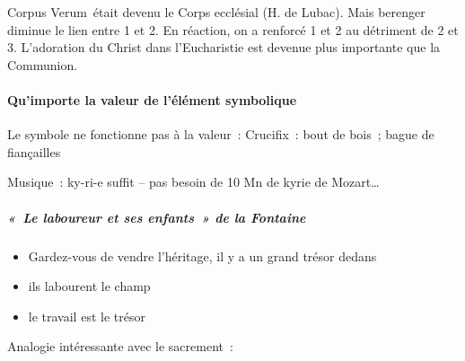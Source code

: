 Corpus Verum~était devenu le Corps ecclésial (H. de Lubac). Mais
berenger diminue le lien entre 1 et 2. En réaction, on a renforcé 1 et 2
au détriment de 2 et 3. L'adoration du Christ dans l'Eucharistie est
devenue plus importante que la Communion.

\hypertarget{quimporte-la-valeur-de-luxe9luxe9ment-symbolique}{%
\paragraph{Qu'importe la valeur de l'élément
symbolique}\label{quimporte-la-valeur-de-luxe9luxe9ment-symbolique}}

Le symbole ne fonctionne pas à la valeur~: Crucifix~: bout de bois~;
bague de fiançailles

Musique~: ky-ri-e suffit -- pas besoin de 10 Mn de kyrie de
Mozart\ldots{}

\hypertarget{le-laboureur-et-ses-enfants-de-la-fontaine}{%
\subparagraph{«~Le laboureur et ses enfants~» de la
Fontaine}\label{le-laboureur-et-ses-enfants-de-la-fontaine}}

\begin{itemize}
\item
  Gardez-vous de vendre l'héritage, il y a un grand trésor dedans
\item
  ils labourent le champ
\item
  le travail est le trésor
\end{itemize}

Analogie intéressante avec le sacrement~:

